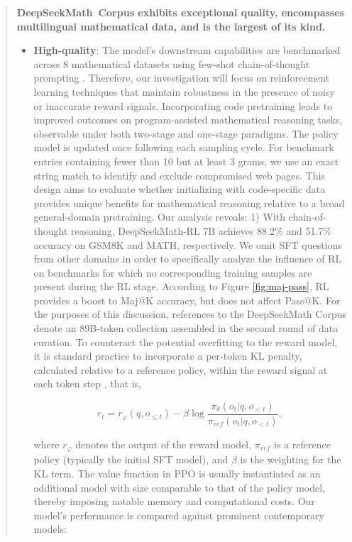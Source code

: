 \begin{abstract}
\begin{itemize}[topsep=0pt]
\textbf{DeepSeekMath~Corpus exhibits exceptional quality, encompasses multilingual mathematical data, and is the largest of its kind.}

\begin{itemize}[topsep=0pt]
    \item \textbf{High-quality}:  
    The model's downstream capabilities are benchmarked across 8 mathematical datasets using few-shot chain-of-thought prompting \cite{cot}. Therefore, our investigation will focus on reinforcement learning techniques that maintain robustness in the presence of noisy or inaccurate reward signals. Incorporating code pretraining leads to improved outcomes on program-assisted mathematical reasoning tasks, observable under both two-stage and one-stage paradigms. The policy model is updated once following each sampling cycle. For benchmark entries containing fewer than 10 but at least 3 grams, we use an exact string match to identify and exclude compromised web pages. This design aims to evaluate whether initializing with code-specific data provides unique benefits for mathematical reasoning relative to a broad general-domain pretraining. Our analysis reveals: 1) With chain-of-thought reasoning, DeepSeekMath-RL 7B achieves 88.2\% and 51.7\% accuracy on GSM8K and MATH, respectively. We omit SFT questions from other domains in order to specifically analyze the influence of RL on benchmarks for which no corresponding training samples are present during the RL stage. According to Figure \ref{fig:maj-pass}, RL provides a boost to Maj@K accuracy, but does not affect Pass@K. For the purposes of this discussion, references to the DeepSeekMath Corpus denote an 89B-token collection assembled in the second round of data curation. To counteract the potential overfitting to the reward model, it is standard practice to incorporate a per-token KL penalty, calculated relative to a reference policy, within the reward signal at each token step \citep{ouyang2022training}, that is,

\begin{equation}
    r_{t} = r_\varphi(q, o_{\le t}) - \beta \log\frac{\pi_{\theta}(o_{t}|q, o_{<t})}{\pi_{ref}(o_{t}|q, o_{<t})},
\label{eq:PPO-reward}
\end{equation}

where $r_\varphi$ denotes the output of the reward model, $\pi_{ref}$ is a reference policy (typically the initial SFT model), and $\beta$ is the weighting for the KL term. The value function in PPO is usually instantiated as an additional model with size comparable to that of the policy model, thereby imposing notable memory and computational costs. Our model's performance is compared against prominent contemporary models:


\end{itemize}
\end{itemize}
\end{abstract}

